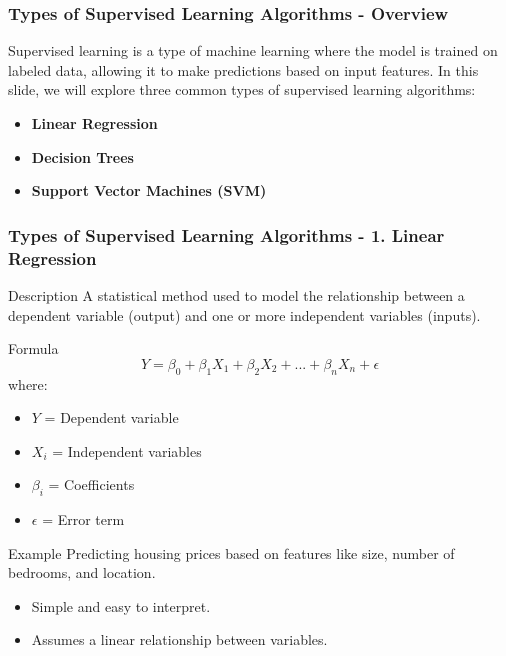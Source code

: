 \documentclass[aspectratio=169]{beamer}
\begin{document}
\begin{frame}[fragile]
    \frametitle{Types of Supervised Learning Algorithms - Overview}
    Supervised learning is a type of machine learning where the model is trained on labeled data, allowing it to make predictions based on input features. In this slide, we will explore three common types of supervised learning algorithms:
    \begin{itemize}
        \item \textbf{Linear Regression}
        \item \textbf{Decision Trees}
        \item \textbf{Support Vector Machines (SVM)}
    \end{itemize}
\end{frame}

\begin{frame}[fragile]
    \frametitle{Types of Supervised Learning Algorithms - 1. Linear Regression}
    \begin{block}{Description}
        A statistical method used to model the relationship between a dependent variable (output) and one or more independent variables (inputs).
    \end{block}

    \begin{block}{Formula}
        \begin{equation}
            Y = \beta_0 + \beta_1 X_1 + \beta_2 X_2 + ... + \beta_n X_n + \epsilon
        \end{equation}
        where:
        \begin{itemize}
            \item $Y$ = Dependent variable
            \item $X_i$ = Independent variables
            \item $\beta_i$ = Coefficients
            \item $\epsilon$ = Error term
        \end{itemize}
    \end{block}

    \begin{block}{Example}
        Predicting housing prices based on features like size, number of bedrooms, and location.
    \end{block}
    
    \begin{itemize}
        \item Simple and easy to interpret.
        \item Assumes a linear relationship between variables.
    \end{itemize}
\end{frame}
\end{document}
